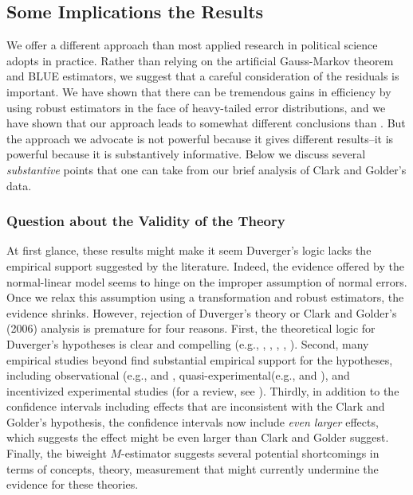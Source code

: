 \documentclass[12pt]{article}
\begin{document}
\subsection*{Some Implications the Results}

We offer a different approach than most applied research in political science adopts in practice. 
Rather than relying on the artificial Gauss-Markov theorem and BLUE estimators, we suggest that a careful consideration of the residuals is important. 
We have shown that there can be tremendous gains in efficiency by using robust estimators in the face of heavy-tailed error distributions, and we have shown that our approach leads to somewhat different conclusions than \cite{ClarkGolder2006}. 
But the approach we advocate is not powerful because it gives different results--it is powerful because it is substantively informative. 
Below we discuss several \textit{substantive} points that one can take from our brief analysis of Clark and Golder's data.

\subsubsection*{Question about the Validity of the Theory}

At first glance, these results might make it seem Duverger's logic lacks the empirical support suggested by the literature. Indeed, the evidence offered by the normal-linear model seems to hinge on the improper assumption of normal errors. 
Once we relax this assumption using a transformation and robust estimators, the evidence shrinks. However, rejection of Duverger's theory or Clark and Golder's (2006) analysis is premature for four reasons. 
First, the theoretical logic for Duverger's hypotheses is clear and compelling (e.g., \citealt{Duverger1963}, \citealt{Riker1982}, \citealt{Cox1997}, \citealt{AmorimNetoCox1997}, \cite{Cox1999}). 
Second, many empirical studies beyond \cite{ClarkGolder2006} find substantial empirical support for the hypotheses, including observational (e.g., \citealt{ChhibberKollman1998} and \citealt{SingerStephenson2009}, quasi-experimental(e.g., \citealt{Blaisetal2011} and \citealt{Fujiwara2011}), and incentivized experimental studies (for a review, see \citealt{Rietz2008}). 
Thirdly, in addition to the confidence intervals including effects that are inconsistent with the Clark and Golder's hypothesis, the confidence intervals now include \textit{even larger} effects, which suggests the effect might be even larger than Clark and Golder suggest.
Finally, the biweight $M$-estimator suggests several potential shortcomings in terms of concepts, theory, measurement that might currently undermine the evidence for these theories.
\end{document}
